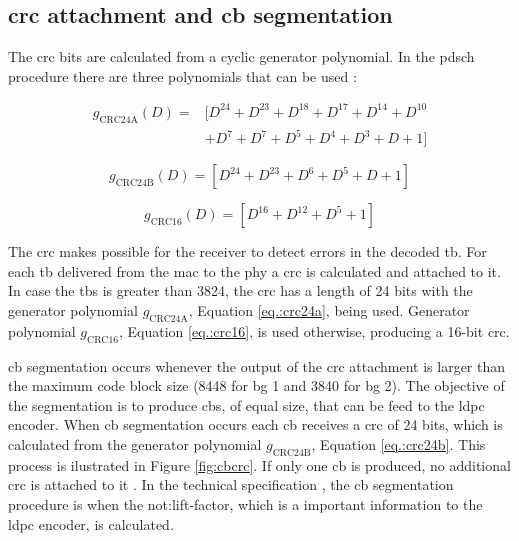 \subsection{\gls{crc} attachment and \gls{cb} segmentation}

The \gls{crc} bits are calculated from a cyclic generator polynomial.
%
In the \gls{pdsch} procedure there are three polynomials that can be used \cite{3gpp.38.212}:

\begin{equation} \label{eq.:crc24a}
    \begin{split}
        g_{\mathrm{CRC24A}}(D) = & [ D^{24} + D^{23} + D^{18} + D^{17} +  D^{14} + D^{10} \\ & + D^{7} + D^{7} + D^{5} + D^{4} + D^{3} + D + 1 ]
    \end{split}
\end{equation}

\begin{equation}\label{eq.:crc24b}
    g_{\mathrm{CRC24B}}(D) = \left[ D^{24} + D^{23} + D^{6} + D^{5} + D + 1 \right]
\end{equation}

\begin{equation} \label{eq.:crc16}
    g_{\mathrm{CRC16}}(D) = \left[ D^{16} + D^{12} + D^{5} + 1 \right]
\end{equation}


The \gls{crc} makes possible for the receiver to detect errors in the decoded \gls{tb}.
%
For each \gls{tb} delivered from the \gls{mac} to the \gls{phy} a \gls{crc} is calculated and attached to it.
%
In case the \gls{tbs} is greater than 3824, the \gls{crc} has a length of 24 bits with the generator polynomial $g_{\mathrm{CRC24A}}$, Equation \eqref{eq.:crc24a}, being used.
%
Generator polynomial $g_{\mathrm{CRC16}}$, Equation \eqref{eq.:crc16}, is used otherwise, producing a 16-bit \gls{crc}.


\Gls{cb} segmentation occurs whenever the output of the \gls{crc} attachment is larger than the maximum code block size (8448 for \gls{bg} 1 and 3840 for \gls{bg} 2).
%
The objective of the segmentation is to produce \glspl{cb}, of equal size, that can be feed to the \gls{ldpc} encoder.
%
When \gls{cb} segmentation occurs each \gls{cb} receives a \gls{crc} of 24 bits, which is calculated from the generator polynomial $g_{\mathrm{CRC24B}}$, Equation \eqref{eq.:crc24b}.
%
This process is ilustrated in Figure \ref{fig:cbcrc}.
%
If only one \gls{cb} is produced, no additional \gls{crc} is attached to it \cite{ErikDahlman5G, 3gpp.38.212}.
%
In the technical specification \cite{3gpp.38.212}, the \gls{cb} segmentation procedure is when the \gls{not:lift-factor}, which is a important information to the \gls{ldpc} encoder, is calculated.

